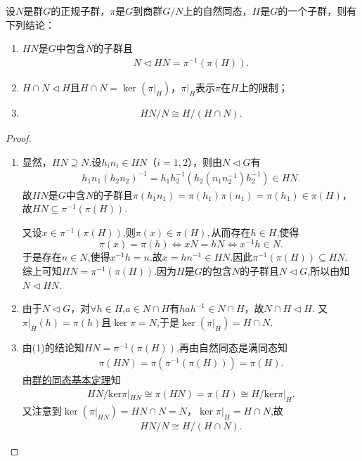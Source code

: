 \documentclass[../../main.tex]{subfiles}%
\begin{document}
\begin{theorem}\label{theorem:抽象代数--定理1.7.3}
设$N$是群$G$的正规子群，$\pi$是$G$到商群$G/N$上的自然同态，$H$是$G$的一个子群，则有下列结论：
\begin{enumerate}[(1)]
\item\label{theorem:抽象代数--定理1.7.3-1} $HN$是$G$中包含$N$的子群且
\begin{align}
N\lhd HN = \pi^{-1}(\pi(H)). \label{eq:::fi0ejw89f38j843g2fw2f4}
\end{align}

\item\label{theorem:抽象代数--定理1.7.3-2} $H \cap N \lhd H$且$H \cap N = \ker(\pi|_H)$，$\pi|_H$表示$\pi$在$H$上的限制；

\item\label{theorem:抽象代数--定理1.7.3-3}
\begin{align*}
HN/N \cong H/(H \cap N ).
\end{align*}
\end{enumerate}
\end{theorem}
\begin{remark}

\end{remark}
\begin{proof}
\begin{enumerate}[(1)]
\item 显然，$HN \supseteq N$.设$h_in_i \in HN$（$i=1,2$），则由$N\lhd G$有
\begin{align*}
h_1n_1(h_2n_2)^{-1} = h_1h_2^{-1}(h_2(n_1n_2^{-1})h_2^{-1}) \in HN.
\end{align*}
故$HN$是$G$中含$N$的子群且$\pi(h_1n_1) = \pi(h_1)\pi(n_1) = \pi(h_1)\in \pi(H)$，故$HN \subseteq \pi^{-1}(\pi(H))$. 

又设$x\in \pi^{-1}(\pi(H))$,则$\pi(x)\in \pi(H),$从而存在$h\in H$,使得
$$
\pi(x)=\pi(h)\iff xN=hN\iff x^{-1}h\in N.
$$
于是存在$n\in N$,使得$x^{-1}h=n$.故$x=hn^{-1}\in HN.$因此$\pi^{-1}(\pi(H))\subseteq HN.$
综上可知$HN = \pi^{-1}(\pi(H))$.因为$H$是$G$的包含$N$的子群且$N\lhd G$,所以由知$N\lhd HN$.

\item 由于$N \lhd G$，对$\forall h \in H$,$a \in N \cap H$有$hah^{-1} \in N \cap H$，故$N \cap H \lhd H$. 又$\pi|_H(h) = \pi(h)$且$\ker \pi=N$,于是$\ker(\pi|_H) = H \cap N$.

\item 由(1)的结论知$HN=\pi^{-1}(\pi(H))$,再由自然同态是满同态知
\begin{align*}
\pi(HN) = \pi(\pi^{-1}(\pi(H)))=\pi(H).
\end{align*}
由\hyperref[theorem:群的同态基本定理]{群的同态基本定理}知
\begin{align*}
HN/\mathrm{ker}\pi |_{HN}\cong \pi (HN)=\pi \left( H \right) \cong H/\mathrm{ker}\pi |_H.
\end{align*}
又注意到$\ker(\pi|_{HN}) = HN \cap N = N$，$\ker \pi|_{H}=H\cap N$,故
\begin{align*}
HN/N \cong H/(H \cap N ).
\end{align*}
\end{enumerate}

\end{proof}
\end{document}
